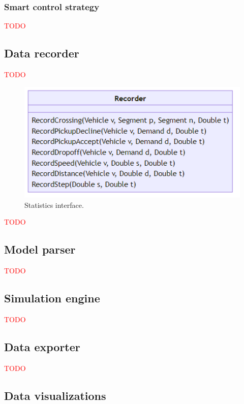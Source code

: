 \documentclass[10pt,twocolumn]{article}
\begin{document}
\subsubsection*{Smart control strategy}
\label{sec:controller-smart}

\textcolor{red}{TODO}

\subsection{Data recorder}
\label{sec:statistics-interface}

\textcolor{red}{TODO}

\begin{figure}[!ht]
    \centering
    \includegraphics[scale=0.4]{../../diagrams/statistics/classes-v2.png}
    \caption{Statistics interface.}
    \label{fig:statistics-interface}
\end{figure}

\textcolor{red}{TODO}

\subsection{Model parser}

\textcolor{red}{TODO}

\subsection{Simulation engine}

\textcolor{red}{TODO}

\subsection{Data exporter}

\textcolor{red}{TODO}

\subsection{Data visualizations}
\label{sec:gui}
\end{document}
